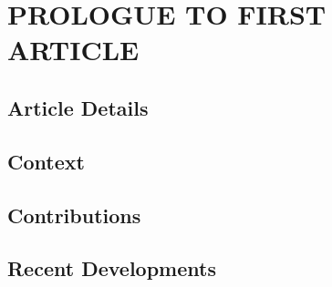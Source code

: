 \chapter{PROLOGUE TO FIRST ARTICLE}


\section{Article Details}


\section{Context}


\section{Contributions}


\section{Recent Developments}
